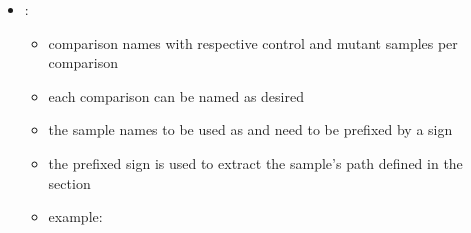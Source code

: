 \documentclass[letterpaper,10pt,english]{sphinxhowto}
\begin{document}
\begin{sphinxVerbatim}[commandchars=\\\{\}]
    
    
    
\end{sphinxVerbatim}
\begin{itemize}
\item {} 
\sphinxAtStartPar
{}:
\begin{itemize}
\item {} 
\sphinxAtStartPar
comparison names with respective control and mutant samples per comparison

\item {} 
\sphinxAtStartPar
each comparison can be named as desired

\item {} 
\sphinxAtStartPar
the sample names to be used as  and  need to be prefixed by a \sphinxtitleref{*} sign

\item {} 
\sphinxAtStartPar
the \sphinxtitleref{*} prefixed sign is used to extract the sample’s path defined in the  section

\item {} 
\sphinxAtStartPar
example:

\end{itemize}

\end{itemize}

\begin{sphinxVerbatim}[commandchars=\\\{\}]
     
     
     
     
\end{sphinxVerbatim}
\end{document}
